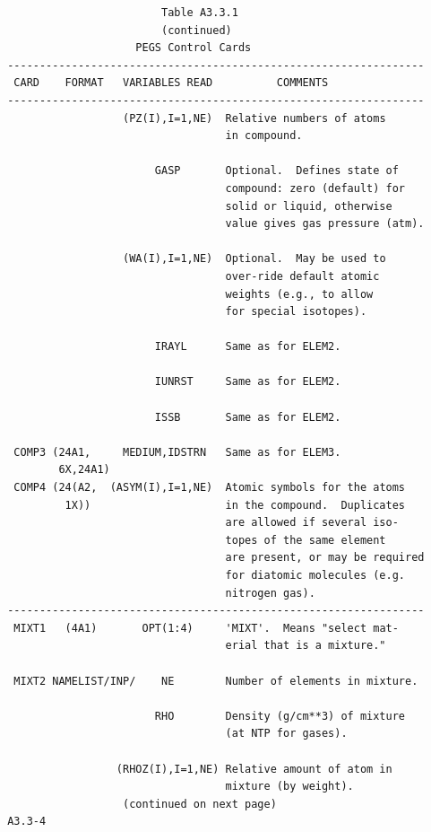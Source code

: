 \newpage {} \begin{verbatim}
                         Table A3.3.1
                         (continued)
                     PEGS Control Cards
 -----------------------------------------------------------------
  CARD    FORMAT   VARIABLES READ          COMMENTS
 -----------------------------------------------------------------
                   (PZ(I),I=1,NE)  Relative numbers of atoms
                                   in compound.
 
                        GASP       Optional.  Defines state of
                                   compound: zero (default) for
                                   solid or liquid, otherwise
                                   value gives gas pressure (atm).
 
                   (WA(I),I=1,NE)  Optional.  May be used to
                                   over-ride default atomic
                                   weights (e.g., to allow
                                   for special isotopes).
 
                        IRAYL      Same as for ELEM2.
 
                        IUNRST     Same as for ELEM2.
 
                        ISSB       Same as for ELEM2.
 
  COMP3 (24A1,     MEDIUM,IDSTRN   Same as for ELEM3.
         6X,24A1)
  COMP4 (24(A2,  (ASYM(I),I=1,NE)  Atomic symbols for the atoms
          1X))                     in the compound.  Duplicates
                                   are allowed if several iso-
                                   topes of the same element
                                   are present, or may be required
                                   for diatomic molecules (e.g.
                                   nitrogen gas).
 -----------------------------------------------------------------
  MIXT1   (4A1)       OPT(1:4)     'MIXT'.  Means "select mat-
                                   erial that is a mixture."
 
  MIXT2 NAMELIST/INP/    NE        Number of elements in mixture.
 
                        RHO        Density (g/cm**3) of mixture
                                   (at NTP for gases).
 
                  (RHOZ(I),I=1,NE) Relative amount of atom in
                                   mixture (by weight).
                   (continued on next page)
 A3.3-4 
\end{verbatim} 

